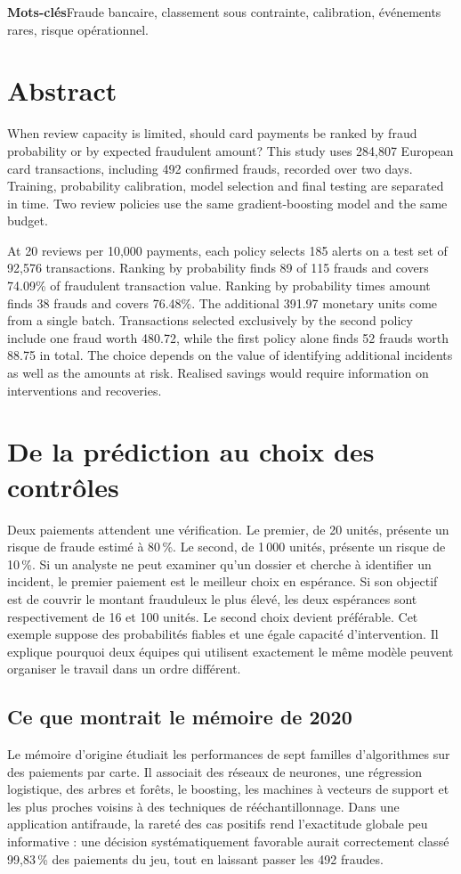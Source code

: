 \documentclass[11pt,a4paper]{article}
\begin{document}
\textbf{Mots-clés}\quad Fraude bancaire, classement sous contrainte, calibration, événements rares, risque opérationnel.
\vspace{4mm}
\begingroup{}
\section*{Abstract}
When review capacity is limited, should card payments be ranked by fraud probability or by expected fraudulent amount? This study uses 284,807 European card transactions, including 492 confirmed frauds, recorded over two days. Training, probability calibration, model selection and final testing are separated in time. Two review policies use the same gradient-boosting model and the same budget.

At 20 reviews per 10,000 payments, each policy selects 185 alerts on a test set of 92,576 transactions. Ranking by probability finds 89 of 115 frauds and covers 74.09\% of fraudulent transaction value. Ranking by probability times amount finds 38 frauds and covers 76.48\%. The additional 391.97 monetary units come from a single batch. Transactions selected exclusively by the second policy include one fraud worth 480.72, while the first policy alone finds 52 frauds worth 88.75 in total. The choice depends on the value of identifying additional incidents as well as the amounts at risk. Realised savings would require information on interventions and recoveries.
\endgroup
\clearpage
\tableofcontents
\clearpage
{}

\section{De la prédiction au choix des contrôles}\label{sec:intro}
Deux paiements attendent une vérification. Le premier, de 20 unités, présente un risque de fraude estimé à 80\,\%. Le second, de 1\,000 unités, présente un risque de 10\,\%. Si un analyste ne peut examiner qu'un dossier et cherche à identifier un incident, le premier paiement est le meilleur choix en espérance. Si son objectif est de couvrir le montant frauduleux le plus élevé, les deux espérances sont respectivement de 16 et 100 unités. Le second choix devient préférable. Cet exemple suppose des probabilités fiables et une égale capacité d'intervention. Il explique pourquoi deux équipes qui utilisent exactement le même modèle peuvent organiser le travail dans un ordre différent.

\subsection{Ce que montrait le mémoire de 2020}
Le mémoire d'origine étudiait les performances de sept familles d'algorithmes sur des paiements par carte. Il associait des réseaux de neurones, une régression logistique, des arbres et forêts, le boosting, les machines à vecteurs de support et les plus proches voisins à des techniques de rééchantillonnage. Dans une application antifraude, la rareté des cas positifs rend l'exactitude globale peu informative : une décision systématiquement favorable aurait correctement classé 99,83\,\% des paiements du jeu, tout en laissant passer les 492 fraudes.
\end{document}
